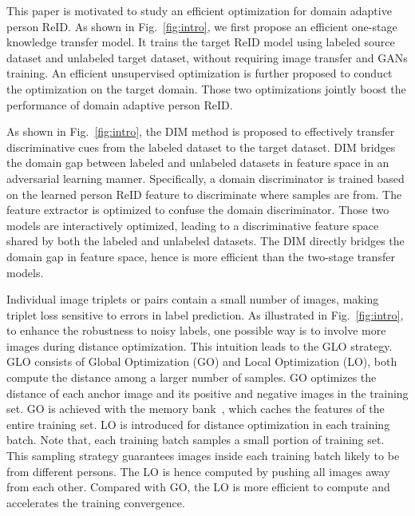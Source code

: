 \documentclass[sigconf]{acmart}
\begin{document}
This paper is motivated to study an efficient optimization for domain adaptive person ReID. As shown in Fig.~\ref{fig:intro}, we first propose an efficient one-stage knowledge transfer model. It trains the target ReID model using labeled source dataset and unlabeled target dataset, without requiring image transfer and GANs training. An efficient unsupervised optimization is further proposed to conduct the optimization on the target domain. Those two optimizations jointly boost the performance of domain adaptive person ReID.

As shown in Fig.~\ref{fig:intro}, the DIM method is proposed to effectively transfer discriminative cues from the labeled dataset to the target dataset. DIM bridges the domain gap between labeled and unlabeled datasets in feature space in an adversarial learning manner. Specifically, a domain discriminator is trained based on the learned person ReID feature to discriminate where samples are from. The feature extractor is optimized to confuse the domain discriminator. Those two models are interactively optimized, leading to a discriminative feature space shared by both the labeled and unlabeled datasets. The DIM directly bridges the domain gap in feature space, hence is more efficient than the two-stage transfer models.

Individual image triplets or pairs contain a small number of images, making triplet loss sensitive to errors in label prediction. As illustrated in Fig.~\ref{fig:intro}, to enhance the robustness to noisy labels, one possible way is to involve more images during distance optimization. This intuition leads to the GLO strategy. GLO consists of Global Optimization (GO) and Local Optimization (LO), both compute the distance among a larger number of samples. GO optimizes the distance of each anchor image and its positive and negative images in the training set. GO is achieved with the memory bank~\cite{wu2018unsupervised}, which caches the features of the entire training set. LO is introduced for distance optimization in each training batch. Note that, each training batch samples a small portion of training set. This sampling strategy guarantees images inside each training batch likely to be from different persons. The LO is hence computed by pushing all images away from each other. Compared with GO, the LO is more efficient to compute and accelerates the training convergence.
\end{document}
